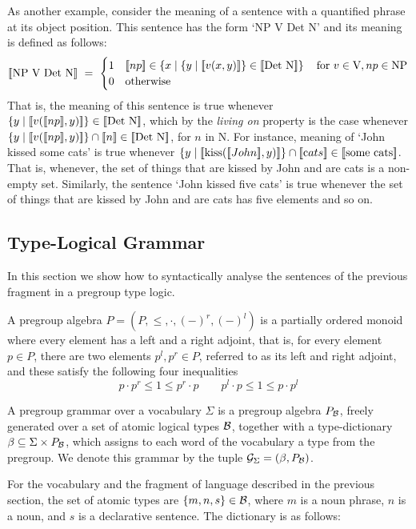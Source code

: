 As another example, consider the  meaning of a sentence with a quantified phrase at its object position. This sentence has the form  `NP V Det N'  and its meaning is defined as follows:
\[
\semantics{\mbox{NP V Det N}} \ = \ \begin{cases} 1 & \semantics{np} \in  \left\{x \mid \{y \mid \semantics{v(x,y)}\} \in \semantics{\mbox{Det N}}\right\}\quad \text{for} \ v \in \text{V}, np \in \text{NP} \\
0 & \mbox{otherwise}
\end{cases}
\] 
That is, the meaning of this sentence is true whenever  $\{y \mid [\![ v([\![ np ]\!],y) ]\!]\}  \in [\![ \mbox{Det N} ]\!]$, which by the \emph{living on} property is the case whenever  $\{y \mid \semantics{v(\semantics{np},y)}\}  \cap \semantics{n} \in \semantics{\mbox{Det N}}$, for $n$ in N. For instance, meaning of `John kissed some cats' is true whenever $\{y \mid \semantics{\text{kiss}(\semantics{John}, y)}\} \cap \semantics{\text cats} \in \semantics{\mbox{some cats}}$. That is, whenever, the set of things that are kissed by John and are cats is a non-empty set. Similarly, the sentence `John kissed five cats' is true whenever the set of things that are kissed by John and are cats has five elements and so on. 


\subsection{Type-Logical Grammar}
In this section we show how to syntactically analyse the sentences  of the previous fragment in a pregroup type logic. 


A pregroup algebra $P = (P, \leq, \cdot, (-)^r, (-)^l)$  is a partially ordered monoid where every element has a left and a right adjoint, that is, for every element $p \in P$, there are two elements $p^l, p^r \in P$, referred to as its left and right adjoint, and these satisfy the following four inequalities
\[
p \cdot p^r \leq 1 \leq p^r \cdot p\qquad
p^l \cdot p \leq 1 \leq p \cdot p^l
\]

A pregroup grammar over a vocabulary $\Sigma$  is a pregroup algebra $P_{\cal B}$,  freely generated over a  set of  atomic logical types ${\cal B}$,  together with a type-dictionary $\beta \subseteq \Sigma \times P_{\cal B}$, which assigns to each word of the vocabulary a  type from the pregroup.  We denote this grammar by the tuple ${\cal G}_{\Sigma} = (\beta, P_{\cal B})$. 

For the vocabulary and the  fragment of language described in the previous section, the set of atomic types are $\{m, n, s\} \in {\cal B}$, where $m$ is a noun phrase, $n$ is a noun, and $s$ is a declarative sentence.  The dictionary is as follows:

